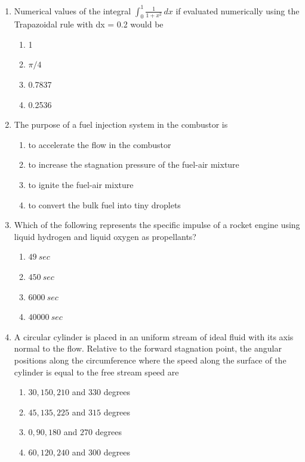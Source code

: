 \documentclass{article}
\begin{document}
\begin{enumerate}
    \item Numerical values of the integral 
    $\int_{0}^{1} \frac{1}{1 + x^2}\,dx$ if evaluated numerically using the Trapazoidal rule with dx = 0.2 would be
    \begin{multicols}{4}
    \begin{enumerate}
        \item 1
        \item $\pi/4$
        \item 0.7837
        \item 0.2536
    \end{enumerate}
    \end{multicols}

    \item The purpose of a fuel injection system in the combustor is
    \begin{enumerate}
        \item to accelerate the flow in the combustor
        \item to increase the stagnation pressure of the fuel-air mixture
        \item to ignite the fuel-air mixture
        \item to convert the bulk fuel into tiny droplets
    \end{enumerate}

    \item Which of the following represents the specific impulse of a rocket engine using liquid hydrogen and liquid oxygen as propellants?
    \begin{multicols}{4}
    \begin{enumerate}
        \item $49\ sec$
        \item $450\ sec$
        \item $6000\ sec$
        \item $40000\ sec$
    \end{enumerate}
    \end{multicols}
    

    \item A circular cylinder is placed in an uniform stream of ideal fluid with its axis normal to the flow. Relative to the forward stagnation point, the angular positions along the circumference where the speed along the surface of the cylinder is equal to the free stream speed are
    \begin{enumerate}
        \item $30, 150, 210$ and $330$ degrees
        \item $45, 135, 225$ and $315$ degrees
        \item $0, 90, 180$ and $270$ degrees
        \item $60, 120, 240$ and $300$ degrees
    \end{enumerate}


\end{enumerate}
\end{document}
